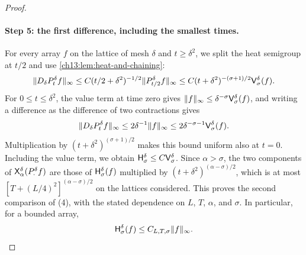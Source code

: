 \begin{proof}
\paragraph{Step 5: the first difference, including the smallest times.}
For every array $f$ on the lattice of mesh $\delta$ and $t\ge\delta^2$, we split the heat semigroup at $t/2$ and use \cref{ch13:lem:heat-and-chaining}:
\[
 \lVert D_\delta P_t^\delta f\rVert_\infty\le C(t/2+\delta^2)^{-1/2}\lVert P_{t/2}^\delta f\rVert_\infty\le C(t+\delta^2)^{-(\sigma+1)/2}\mathsf V_{\sigma}^{\delta}(f).
\]
For $0\le t\le\delta^2$, the value term at time zero gives $\lVert f\rVert_\infty\le\delta^{-\sigma}\mathsf V_{\sigma}^{\delta}(f)$, and writing a difference as the difference of two contractions gives
\[
 \lVert D_\delta P_t^\delta f\rVert_\infty\le2\delta^{-1}\lVert f\rVert_\infty\le2\delta^{-\sigma-1}\mathsf V_{\sigma}^{\delta}(f).
\]
Multiplication by $(t+\delta^2)^{(\sigma+1)/2}$ makes this bound uniform also at $t=0$. Including the value term, we obtain $\mathsf H_{\sigma}^{\delta}\le C\mathsf V_{\sigma}^{\delta}$. Since $\alpha>\sigma$, the two components of $\mathsf X_{\alpha}^{\delta}(P_\cdot^\delta f)$ are those of $\mathsf H_{\sigma}^{\delta}(f)$ multiplied by $(t+\delta^2)^{(\alpha-\sigma)/2}$, which is at most $[T+(L/4)^2]^{(\alpha-\sigma)/2}$ on the lattices considered. This proves the second comparison of (4), with the stated dependence on $L$, $T$, $\alpha$, and $\sigma$. In particular, for a bounded array,
\begin{equation}\label{ch24:eq:bounded-smoother}
 \mathsf H_{\sigma}^{\delta}(f)\le C_{L,T,\sigma}\lVert f\rVert_\infty.
\end{equation}


\end{proof}
